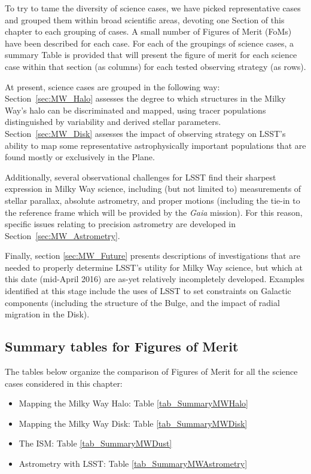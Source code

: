 To try to tame the diversity of science cases, we have picked
representative cases and grouped them within broad scientific areas,
devoting one Section of this chapter to each grouping of cases. A
small number of Figures of Merit (FoMs) have been described for each
case. For each of the groupings of science cases, a summary Table is
provided that will present the figure of merit for each science case
within that section (as columns) for each tested observing strategy
(as rows).

At present, science cases are grouped in the following way:
Section~\ref{sec:MW_Halo} assesses the degree to which structures in
the Milky Way's halo can be discriminated and mapped, using tracer
populations distinguished by variability and derived stellar
parameters.  Section~\ref{sec:MW_Disk} assesses the impact of
observing strategy on LSST's ability to map some representative
astrophysically important populations that are found mostly or
exclusively in the Plane.  

Additionally, several observational challenges for LSST find their
sharpest expression in Milky Way science, including (but not limited
to) measurements of stellar parallax, absolute astrometry, and proper
motions (including the tie-in to the reference frame which will be
provided by the \textit{Gaia} mission). For this reason, specific
issues relating to precision astrometry are developed in
Section~\ref{sec:MW_Astrometry}.

Finally, section \ref{sec:MW_Future} presents descriptions of investigations
that are needed to properly determine LSST's utility for Milky Way
science, but which at this date (mid-April 2016) are as-yet relatively
incompletely developed. Examples identified at this stage include the
uses of LSST to set constraints on Galactic components (including the structure of the Bulge, and the impact of radial migration in the Disk).

\subsection{Summary tables for Figures of Merit}

The tables below organize the comparison of Figures of Merit for all
the science cases considered in this chapter:
\begin{itemize}
  \item Mapping the Milky Way Halo: Table \ref{tab_SummaryMWHalo}
  \item Mapping the Milky Way Disk: Table \ref{tab_SummaryMWDisk}
    \item The ISM: Table \ref{tab_SummaryMWDust}
  \item Astrometry with LSST: Table \ref{tab_SummaryMWAstrometry}
\end{itemize}

